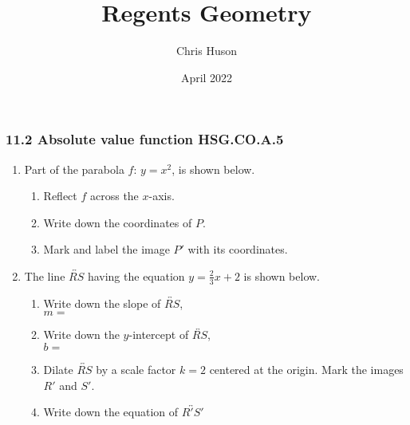 \documentclass[12pt, twoside]{article}
\title{Regents Geometry}
\author{Chris Huson}
\date{April 2022}
\begin{document}
\subsubsection*{11.2 Absolute value function \hfill HSG.CO.A.5}
\begin{enumerate}
\item Part of the parabola $f$: $y=x^2$, is shown below. 
\begin{multicols}{2}
  \begin{enumerate}
    \item Reflect $f$ across the $x$-axis.
    \item Write down the coordinates of $P$.
    \item Mark and label the image $P'$ with its coordinates. \vspace{2cm}
  \end{enumerate}
  \begin{flushright}
\end{flushright}
\end{multicols}

\item The line $\overleftrightarrow{RS}$ having the equation $\displaystyle y=\frac{2}{3}x+2$ is shown below.
\begin{multicols}{2}
  \begin{enumerate}
    \item Write down the slope of $\overleftrightarrow{RS}$,\\[0.25cm] $m=$
    \item Write down the $y$-intercept of $\overleftrightarrow{RS}$,\\[0.25cm] $b=$
    \item Dilate $\overleftrightarrow{RS}$ by a scale factor $k=2$ centered at the origin. Mark the images $R'$ and $S'$.
    \item Write down the equation of $\overleftrightarrow{R'S'}$
  \end{enumerate}
  \begin{flushright}
  \end{flushright}
\end{multicols}%


\end{enumerate}
\end{document}
